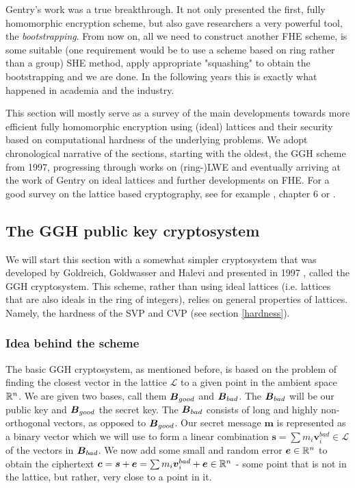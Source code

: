 Gentry's work was a true breakthrough. It not only presented the first, fully homomorphic encryption scheme, but also gave researchers a very powerful tool, the \textit{bootstrapping}. From now on, all we need to construct another FHE scheme, is some suitable (one requirement would be to use a scheme based on ring rather than a group) SHE method, apply appropriate "squashing" to obtain the bootstrapping and we are done. In the following years this is exactly what happened in academia and the industry.

This section will mostly serve as a survey of the main developments towards more efficient fully homomorphic encryption using (ideal) lattices and their security based on computational hardness of the underlying problems. We adopt chronological narrative of the sections, starting with the oldest, the GGH scheme from 1997, progressing through works on (ring-)LWE and eventually arriving at the work of Gentry \cite{gentry_phd} on ideal lattices and further developments on FHE. For a good survey on the lattice based cryptography, see for example \cite{two_faces}, \cite{book} chapter 6 or \cite{lattice-survey}.

\subsection{The GGH public key cryptosystem}
We will start this section with a somewhat simpler cryptosystem that was developed by Goldreich, Goldwasser and Halevi and presented in 1997 \cite{ggh}, called the GGH cryptosystem. This scheme, rather than using ideal lattices (i.e. lattices that are also ideals in the ring of integers), relies on general properties of lattices. Namely, the hardness of the SVP and CVP (see section \ref{hardness}).

\subsubsection*{Idea behind the scheme}
The basic GGH cryptosystem, as mentioned before, is based on the problem of finding the closest vector in the lattice $\mathcal{L}$ to a given point in the ambient space $\mathbb{R}^n$. We are given two bases, call them $\boldsymbol{B}_{good}$ and $\boldsymbol{B}_{bad}$. The $\boldsymbol{B}_{bad}$ will be our public key and $\boldsymbol{B}_{good}$ the secret key. The $\boldsymbol{B}_{bad}$ consists of long and highly non-orthogonal vectors, as opposed to $\boldsymbol{B}_{good}$. Our secret message $\bm{m}$ is represented as a binary vector which we will use to form a linear combination $\bm{s} = \sum m_i \bm{v}_i^{bad} \in \mathcal{L}$ of the vectors in $\boldsymbol{B}_{bad}$. We now add some small and random error $\boldsymbol{e} \in \mathbb{R}^n$ to obtain the ciphertext $\boldsymbol{c} = \boldsymbol{s} + \boldsymbol{e} = \sum m_i \boldsymbol{v}_i^{bad} + \boldsymbol{e} \in \mathbb{R}^n$ - some point that is not in the lattice, but rather, very close to a point in it.\\

